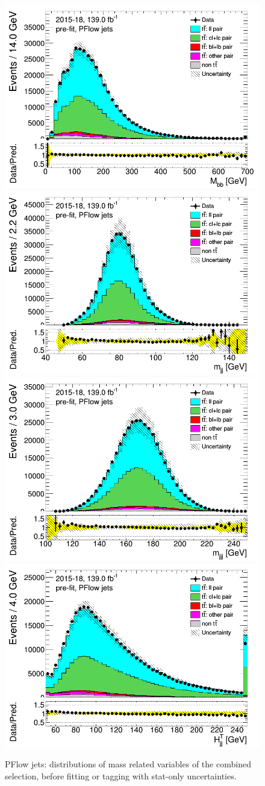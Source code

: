 	\newpage
	\begin{figure}[H]
	\includegraphics[width=.45\textwidth]{FTAG_plots/pretagNoRwwithhighpTPFlowall/DataMC_h_Mbb.png}
	\includegraphics[width=.45\textwidth]{FTAG_plots/pretagNoRwwithhighpTPFlowall/DataMC_h_mjj.png}\\
	\includegraphics[width=.45\textwidth]{FTAG_plots/pretagNoRwwithhighpTPFlowall/DataMC_h_mjjj.png}
	\includegraphics[width=.45\textwidth]{FTAG_plots/pretagNoRwwithhighpTPFlowall/DataMC_h_Htjj.png}\\
	\caption{PFlow jets: distributions of mass related variables of the combined selection, 
	before fitting or 
	tagging with stat-only uncertainties.} \label{fig:combined_mass_PFlow}
	\end{figure}
	
